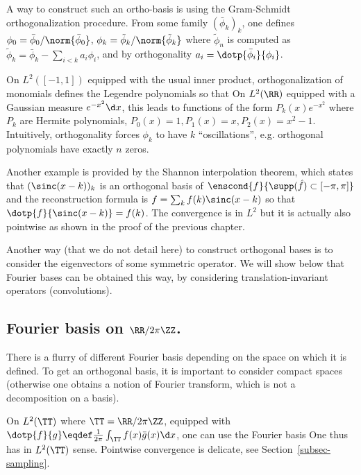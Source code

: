 A way to construct such an ortho-basis is using the Gram-Schmidt orthogonalization procedure. From some family $(\bar\phi_k)_k$, one defines $\phi_0=\bar\phi_0/\norm{\bar\phi_0}$, $\phi_k=\tilde\phi_k/\norm{\tilde\phi_k}$ where $\tilde\phi_n$ is computed as  $\tilde\phi_k=\bar\phi_k - \sum_{i<k} a_i \phi_i$, and by orthogonality $a_i = \dotp{\bar \phi_i}{\phi_i}$. 

On $L^2([-1,1])$ equipped with the usual inner product, orthogonalization of monomials defines the Legendre polynomials so that
On $L^2(\RR)$ equipped with a Gaussian measure $e^{-x^2}\d x$, this leads to functions of the form $P_k(x) e^{-x^2}$ where $P_k$ are Hermite polynomials, $P_0(x)=1, P_1(x)=x, P_2(x)=x^2-1$. Intuitively, orthogonality forces $\phi_k$ to have $k$ ``oscillations'', e.g. orthogonal polynomials have exactly $n$ zeros.

Another example is provided by the Shannon interpolation theorem, which states that $( \sinc(x-k) )_k$ is an orthogonal basis of $\enscond{f}{\supp(\hat f) \subset [-\pi,\pi]}$ and the reconstruction formula is $f=\sum_k f(k) \sinc(x-k)$ so that $\dotp{f}{\sinc(x-k)} = f(k)$. The convergence is in $L^2$ but it is actually also pointwise as shown in the proof of the previous chapter. 


Another way (that we do not detail here) to construct orthogonal bases is to consider the eigenvectors of some symmetric operator. We will show below that Fourier bases can be obtained this way, by considering translation-invariant operators (convolutions). 


\subsection{Fourier basis on $\RR/2\pi\ZZ$.}

There is a flurry of different Fourier basis depending on the space on which it is defined. To get an orthogonal basis, it is important to consider compact spaces (otherwise one obtains a notion of Fourier transform, which is not a decomposition on a basis). 

On $L^2(\TT)$ where $\TT=\RR/2\pi\ZZ$, equipped with $\dotp{f}{g} \eqdef \frac{1}{2\pi}\int_\TT f(x) \bar g(x) \d x$, one can use the Fourier basis 
One thus has
in $L^2(\TT)$ sense. Pointwise convergence is delicate, see Section~\ref{subsec-sampling}.

